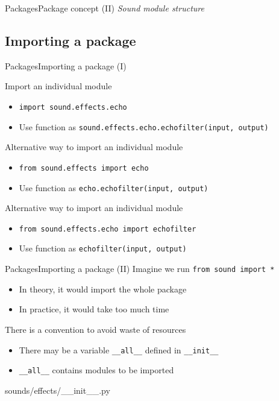 \documentclass[10pt,compress]{beamer} %
\begin{document}
\begin{frame}{Packages}{Package concept (II)}
	\centering \textit{Sound module structure}
	
\end{frame}

\subsection{Importing a package}
\begin{frame}{Packages}{Importing a package (I)}
	\\
	\bigskip
	\begin{flushleft}
	Import an individual module
		\begin{itemize}
		\item \texttt{import sound.effects.echo}
		\item Use function as \texttt{sound.effects.echo.echofilter(input, output)}
		\end{itemize}
	Alternative way to import an individual module
		\begin{itemize}
		\item \texttt{from sound.effects import echo}
		\item Use function as \texttt{echo.echofilter(input, output)}
		\end{itemize}
	Alternative way to import an individual module
		\begin{itemize}
		\item \texttt{from sound.effects.echo import echofilter}
		\item Use function as \texttt{echofilter(input, output)}
		\end{itemize}
	\end{flushleft}
\end{frame}

\begin{frame}{Packages}{Importing a package (II)}
	Imagine we run \texttt{from sound import *}
		\begin{itemize}
		\item In theory, it would import the whole package
		\item In practice, it would take too much time
		\end{itemize}
	There is a convention to avoid waste of resources
		\begin{itemize}
		\item There may be a variable \texttt{\_\_all\_\_} defined in \texttt{\_\_init\_\_}
		\item \texttt{\_\_all\_\_} contains modules to be imported
		\end{itemize}

	\begin{block}{sounds/effects/\_\_init\_\_.py}
	\vspace{-0.2cm}
	
	\vspace{-0.2cm}
	\end{block}
\end{frame}
\end{document}
